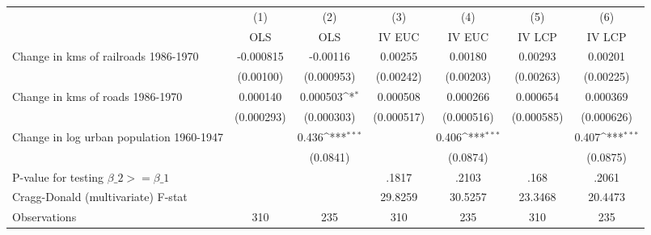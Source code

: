 {
\def\sym#1{\ifmmode^{#1}\else\(^{#1}\)\fi}
\begin{tabular}{l*{6}{c}}
\hline\hline
                &\multicolumn{1}{c}{(1)}&\multicolumn{1}{c}{(2)}&\multicolumn{1}{c}{(3)}&\multicolumn{1}{c}{(4)}&\multicolumn{1}{c}{(5)}&\multicolumn{1}{c}{(6)}\\
                &\multicolumn{1}{c}{OLS}&\multicolumn{1}{c}{OLS}&\multicolumn{1}{c}{IV EUC}&\multicolumn{1}{c}{IV EUC}&\multicolumn{1}{c}{IV LCP}&\multicolumn{1}{c}{IV LCP}\\
\hline
Change in kms of railroads 1986-1970&-0.000815         & -0.00116         &  0.00255         &  0.00180         &  0.00293         &  0.00201         \\
                &(0.00100)         &(0.000953)         &(0.00242)         &(0.00203)         &(0.00263)         &(0.00225)         \\
[1em]
Change in kms of roads 1986-1970& 0.000140         & 0.000503\sym{*}  & 0.000508         & 0.000266         & 0.000654         & 0.000369         \\
                &(0.000293)         &(0.000303)         &(0.000517)         &(0.000516)         &(0.000585)         &(0.000626)         \\
[1em]
Change in log urban population 1960-1947&                  &    0.436\sym{***}&                  &    0.406\sym{***}&                  &    0.407\sym{***}\\
                &                  & (0.0841)         &                  & (0.0874)         &                  & (0.0875)         \\
\hline
P-value for testing $\beta\_{2} >= \beta\_{1}$&                  &                  &    .1817         &    .2103         &     .168         &    .2061         \\
Cragg-Donald (multivariate) F-stat&                  &                  &  29.8259         &  30.5257         &  23.3468         &  20.4473         \\
Observations    &      310         &      235         &      310         &      235         &      310         &      235         \\
\hline\hline
\end{tabular}
}
